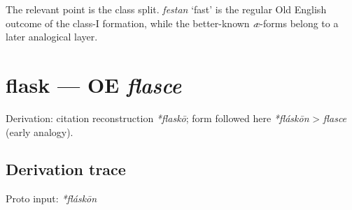 \documentclass[
  british,
  a4paper,
  openany]{book}
\providecommand{\texorpdfstring}[2]{#1}
\begin{document}
The relevant point is the class split. {\emph{festan}} `fast' is the
regular Old English outcome of the class-I formation, while the
better-known \emph{æ}-forms belong to a later analogical layer.

\section{\texorpdfstring{flask --- OE
\emph{flasce}}{flask --- OE flasce}}\label{flask-oe-flasce}


Derivation: citation reconstruction \emph{*flaskō}; form followed here
\emph{*fláskōn} \textgreater{} \emph{flasce} (early analogy).

\subsection{Derivation trace}\label{derivation-trace-80}

Proto input: \emph{*fláskōn}

\begingroup
\setlength{\fboxsep}{6pt}
\end{document}
